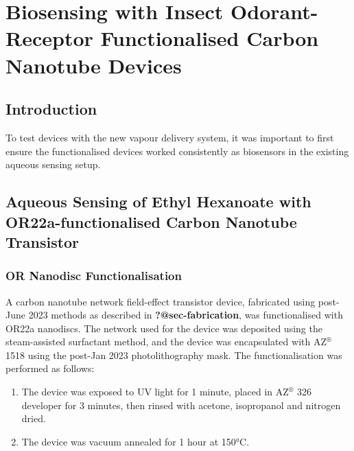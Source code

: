 \documentclass[
  a4paper,
]{scrbook}
\begin{document}
\hypertarget{biosensing-with-insect-odorant-receptor-functionalised-carbon-nanotube-devices}{%
\chapter{Biosensing with Insect Odorant-Receptor Functionalised Carbon
Nanotube
Devices}\label{biosensing-with-insect-odorant-receptor-functionalised-carbon-nanotube-devices}}

\hypertarget{introduction-2}{%
\section{Introduction}\label{introduction-2}}

To test devices with the new vapour delivery system, it was important to
first ensure the functionalised devices worked consistently as
biosensors in the existing aqueous sensing setup.

\hypertarget{sec-aqueous-sensing-EtHex}{%
\section{Aqueous Sensing of Ethyl Hexanoate with OR22a-functionalised
Carbon Nanotube Transistor}\label{sec-aqueous-sensing-EtHex}}

\hypertarget{or-nanodisc-functionalisation}{%
\subsection{OR Nanodisc
Functionalisation}\label{or-nanodisc-functionalisation}}

A carbon nanotube network field-effect transistor device, fabricated
using post-June 2023 methods as described in \textbf{?@sec-fabrication},
was functionalised with OR22a nanodiscs. The network used for the device
was deposited using the steam-assisted surfactant method, and the device
was encapsulated with AZ\(^\circledR\) 1518 using the post-Jan 2023
photolithography mask. The functionalisation was performed as follows:

\begin{enumerate}
\def\labelenumi{\arabic{enumi}.}
\item
  The device was exposed to UV light for 1 minute, placed in
  AZ\(^\circledR\) 326 developer for 3 minutes, then rinsed with
  acetone, isopropanol and nitrogen dried.
\item
  The device was vacuum annealed for 1 hour at 150°C.
\end{enumerate}
\end{document}
